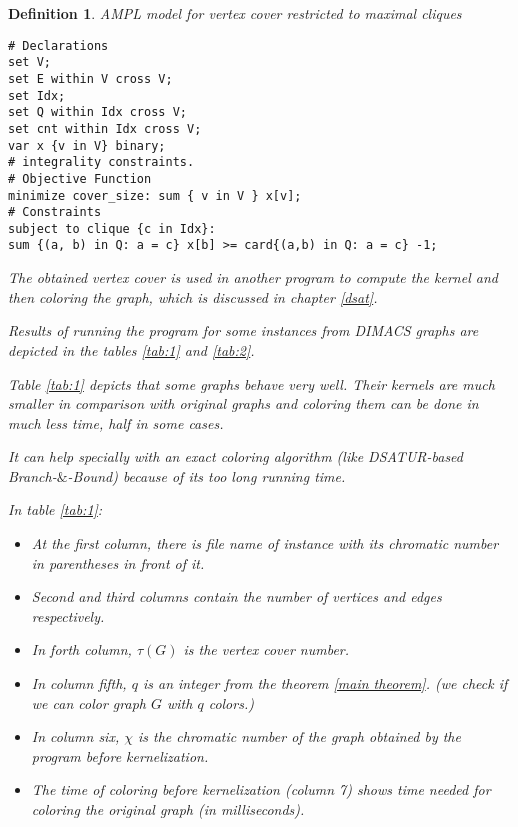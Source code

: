 \documentclass[12pt]{article}
\theoremstyle{slplain}
\newtheorem{defi}{Definition}
\begin{document}
\begin{defi}
\newpage
AMPL model for vertex cover restricted to maximal cliques

\hline

\begin{verbatim}
# Declarations
set V;
set E within V cross V;
set Idx;
set Q within Idx cross V;
set cnt within Idx cross V;
var x {v in V} binary;
# integrality constraints.
# Objective Function
minimize cover_size: sum { v in V } x[v];
# Constraints
subject to clique {c in Idx}:
sum {(a, b) in Q: a = c} x[b] >= card{(a,b) in Q: a = c} -1;
\end{verbatim}

\newpage
The obtained vertex cover is used in another program to compute the
kernel and then coloring the graph, which is discussed in chapter \ref{dsat}.

Results of running the program for some instances from DIMACS graphs \cite{instance} are depicted in the tables \ref{tab:1} and \ref{tab:2}.

Table \ref{tab:1} depicts that some graphs behave very well. Their kernels are much smaller in comparison with original graphs and coloring them can be done in much less time, half in some cases. 

It can help specially with an exact coloring algorithm (like DSATUR-based Branch-$\&$-Bound) because of its too long running time.



In table \ref{tab:1}:

\begin{itemize}
\item At the first column, there is file name of instance with its chromatic number in parentheses in front of it.

\item Second and third columns contain the number of vertices and edges respectively. 

\item In forth column, $\tau(G)$ is the vertex cover number.

\item In column fifth, $q$ is an integer from the theorem \ref{main theorem}. (we check if we can color graph $G$ with $q$ colors.) 
\item In column six, $\chi$ is the chromatic number of the graph obtained by the program before kernelization.

\item The time of coloring before kernelization (column 7) shows time needed for coloring the original graph (in milliseconds).


\end{itemize}
\end{defi}
\end{document}
